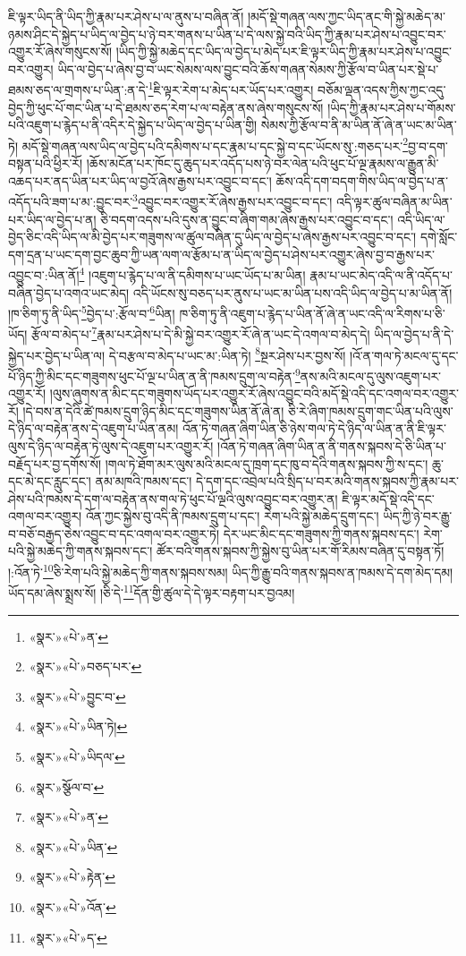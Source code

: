 ཇི་ལྟར་ཡིད་ནི་ཡིད་ཀྱི་རྣམ་པར་ཤེས་པ་ལ་ནུས་པ་བཞིན་ནོ། །མདོ་སྡེ་གཞན་ལས་ཀྱང་ཡིད་ནང་གི་སྐྱེ་མཆེད་མ་ཉམས་ཤིང་དེ་སྐྱེད་པ་ཡིད་ལ་བྱེད་པ་ཉེ་བར་གནས་པ་ཡིན་པ་དེ་ལས་སྐྱེ་བའི་ཡིད་ཀྱི་རྣམ་པར་ཤེས་པ་འབྱུང་བར་འགྱུར་རོ་ཞེས་གསུངས་སོ། །ཡིད་ཀྱི་སྐྱེ་མཆེད་དང་ཡིད་ལ་བྱེད་པ་མེད་པར་ཇི་ལྟར་ཡིད་ཀྱི་རྣམ་པར་ཤེས་པ་འབྱུང་བར་འགྱུར། ཡིད་ལ་བྱེད་པ་ཞེས་བྱ་བ་ཡང་སེམས་ལས་བྱུང་བའི་ཆོས་གཞན་སེམས་ཀྱི་རྩོལ་བ་ཡིན་པར་སྡེ་པ་ཐམས་ཅད་ལ་གྲགས་པ་ཡིན་:ན་དེ་\footnote{«སྣར་»«པེ་»ན་}ཇི་ལྟར་རེག་པ་མེད་པར་ཡོད་པར་འགྱུར། བཅོམ་ལྡན་འདས་ཀྱིས་ཀྱང་འདུ་བྱེད་ཀྱི་ཕུང་པོ་གང་ཡིན་པ་དེ་ཐམས་ཅད་རེག་པ་ལ་བརྟེན་ནས་ཞེས་གསུངས་སོ། །ཡིད་ཀྱི་རྣམ་པར་ཤེས་པ་གོམས་པའི་འཇུག་པ་རྙེད་པ་ནི་འདིར་དེ་སྐྱེད་པ་ཡིད་ལ་བྱེད་པ་ཡིན་གྱི། སེམས་ཀྱི་རྩོལ་བ་ནི་མ་ཡིན་ནོ་ཞེ་ན་ཡང་མ་ཡིན་ཏེ། མདོ་སྡེ་གཞན་ལས་ཡིད་ལ་བྱེད་པའི་དམིགས་པ་དང་རྣམ་པ་དང་སྐྱེ་བ་དང་ཡོངས་སུ་:གཅད་པར་\footnote{«སྣར་»«པེ་»བཅད་པར་}བྱ་བ་དག་བསྟན་པའི་ཕྱིར་རོ། །ཆོས་མངོན་པར་ཁོང་དུ་ཆུད་པར་འདོད་པས་ཉེ་བར་ལེན་པའི་ཕུང་པོ་ལྔ་རྣམས་ལ་རྒྱུན་མི་འཆད་པར་ནད་ཡིན་པར་ཡིད་ལ་བྱའོ་ཞེས་རྒྱས་པར་འབྱུང་བ་དང་། ཆོས་འདི་དག་བདག་གིས་ཡིད་ལ་བྱེད་པ་ན་འདོད་པའི་ཟག་པ་མ་:བྱུང་བར་\footnote{«སྣར་»«པེ་»བྱུང་བ་}འབྱུང་བར་འགྱུར་རོ་ཞེས་རྒྱས་པར་འབྱུང་བ་དང་། འདི་ལྟར་ཚུལ་བཞིན་མ་ཡིན་པར་ཡིད་ལ་བྱེད་པ་ན། ཅི་བདག་འདས་པའི་དུས་ན་བྱུང་བ་ཞིག་གམ་ཞེས་རྒྱས་པར་འབྱུང་བ་དང་། འདི་ཡིད་ལ་བྱེད་ཅིང་འདི་ཡིད་ལ་མི་བྱེད་པར་གཟུགས་ལ་ཚུལ་བཞིན་དུ་ཡིད་ལ་བྱེད་པ་ཞེས་རྒྱས་པར་འབྱུང་བ་དང་། དགེ་སློང་དག་དྲན་པ་ཡང་དག་བྱང་ཆུབ་ཀྱི་ཡན་ལག་ལ་རྩོམ་པ་ན་ཡིད་ལ་བྱེད་པ་ཤེས་པར་འགྱུར་ཞེས་བྱ་བ་རྒྱས་པར་འབྱུང་བ་:ཡིན་ནོ།\footnote{«སྣར་»«པེ་»ཡིན་ཏེ།} །འཇུག་པ་རྙེད་པ་ལ་ནི་དམིགས་པ་ཡང་ཡོད་པ་མ་ཡིན། རྣམ་པ་ཡང་མེད་འདི་ལ་ནི་འདོད་པ་བཞིན་བྱེད་པ་འགའ་ཡང་མེད། འདི་ཡོངས་སུ་བཅད་པར་ནུས་པ་ཡང་མ་ཡིན་པས་འདི་ཡིད་ལ་བྱེད་པ་མ་ཡིན་ནོ། །ཁ་ཅིག་ཏུ་ནི་ཡིད་\footnote{«སྣར་»«པེ་»ཡིདལ་}བྱེད་པ་:རྩོལ་བ་\footnote{«སྣར་»སྩོལ་བ་}ཡིན། ཁ་ཅིག་ཏུ་ནི་འཇུག་པ་རྙེད་པ་ཡིན་ནོ་ཞེ་ན་ཡང་འདི་ལ་རིགས་པ་ཅི་ཡོད། རྩོལ་བ་མེད་པ་\footnote{«སྣར་»«པེ་»ན་}རྣམ་པར་ཤེས་པ་དེ་མི་སྐྱེ་བར་འགྱུར་རོ་ཞེ་ན་ཡང་དེ་འགལ་བ་མེད་དེ། ཡིད་ལ་བྱེད་པ་ནི་དེ་སྐྱེད་པར་བྱེད་པ་ཡིན་ལ། དེ་བརྩལ་བ་མེད་པ་ཡང་མ་:ཡིན་ཏེ། \footnote{«སྣར་»«པེ་»ཡིན་}སྔར་ཤེས་པར་བྱས་སོ། །འོ་ན་གལ་ཏེ་མངལ་དུ་དང་པོ་ཉིད་ཀྱི་མིང་དང་གཟུགས་ཕུང་པོ་ལྔ་པ་ཡིན་ན་ནི་ཁམས་དྲུག་ལ་བརྟེན་\footnote{«སྣར་»«པེ་»རྟེན་}ནས་མའི་མངལ་དུ་ལུས་འཇུག་པར་འགྱུར་རོ། །ལུས་ཞུགས་ན་མིང་དང་གཟུགས་ཡོད་པར་འགྱུར་རོ་ཞེས་འབྱུང་བའི་མདོ་སྡེ་འདི་དང་འགལ་བར་འགྱུར་རོ། །དེ་བས་ན་དེའི་ཚེ་ཁམས་དྲུག་ཉིད་མིང་དང་གཟུགས་ཡིན་ནོ་ཞེ་ན། ཅི་རེ་ཞིག་ཁམས་དྲུག་གང་ཡིན་པའི་ལུས་དེ་ཉིད་ལ་བརྟེན་ནས་དེ་འཇུག་པ་ཡིན་ནམ། འོན་ཏེ་གཞན་ཞིག་ཡིན་ཅི་ཉེས་གལ་ཏེ་དེ་ཉིད་ལ་ཡིན་ན་ནི་ཇི་ལྟར་ལུས་དེ་ཉིད་ལ་བརྟེན་ཏེ་ལུས་དེ་འཇུག་པར་འགྱུར་རོ། །འོན་ཏེ་གཞན་ཞིག་ཡིན་ན་ནི་གནས་སྐབས་དེ་ཅི་ཡིན་པ་བརྗོད་པར་བྱ་དགོས་སོ། །གལ་ཏེ་ཐོག་མར་ལུས་མའི་མངལ་དུ་ཁྲག་དང་ཁུ་བ་དེའི་གནས་སྐབས་ཀྱི་ས་དང་། ཆུ་དང་མེ་དང་རླུང་དང་། ནམ་མཁའི་ཁམས་དང་། དེ་དག་དང་འབྲེལ་པའི་སྲིད་པ་བར་མའི་གནས་སྐབས་ཀྱི་རྣམ་པར་ཤེས་པའི་ཁམས་དེ་དག་ལ་བརྟེན་ནས་གལ་ཏེ་ཕུང་པོ་ལྔའི་ལུས་འབྱུང་བར་འགྱུར་ན། ཇི་ལྟར་མདོ་སྡེ་འདི་དང་འགལ་བར་འགྱུར། འོན་ཀྱང་སྐྱེས་བུ་འདི་ནི་ཁམས་དྲུག་པ་དང་། རེག་པའི་སྐྱེ་མཆེད་དྲུག་དང་། ཡིད་ཀྱི་ཉེ་བར་རྒྱུ་བ་བཅོ་བརྒྱད་ཅེས་འབྱུང་བ་དང་འགལ་བར་འགྱུར་ཏེ། དེར་ཡང་མིང་དང་གཟུགས་ཀྱི་གནས་སྐབས་དང་། རེག་པའི་སྐྱེ་མཆེད་ཀྱི་གནས་སྐབས་དང་། ཚོར་བའི་གནས་སྐབས་ཀྱི་སྐྱེས་བུ་ཡིན་པར་གོ་རིམས་བཞིན་དུ་བསྟན་ཏོ། །:འོན་ཏེ་\footnote{«སྣར་»«པེ་»འོན་}ཅི་རེག་པའི་སྐྱེ་མཆེད་ཀྱི་གནས་སྐབས་སམ། ཡིད་ཀྱི་རྒྱུ་བའི་གནས་སྐབས་ན་ཁམས་དེ་དག་མེད་དམ། ཡོད་དམ་ཞེས་སྨྲས་སོ། །ཅི་དེ་\footnote{«སྣར་»«པེ་»ད་}དོན་གྱི་ཚུལ་དེ་དེ་ལྟར་བརྟག་པར་བྱའམ། 